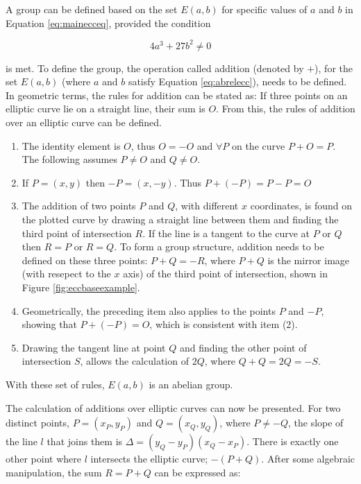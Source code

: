 \documentclass[a4paper,12pt]{report}
\begin{document}
A group can be defined based on the set $E(a,b)$ for specific values of $a$ and $b$ in Equation \ref{eq:mainecceq}, provided the condition

\begin{equation}
 4a^3 + 27b^2 \neq 0
\label{eq:abrelecc}
\end{equation}

is met. To define the group, the operation called addition (denoted by $+$), for the set $E(a,b)$ (where $a$ and $b$ satisfy Equation \ref{eq:abrelecc}), needs to be defined. In geometric terms, the rules for addition can be stated as: If three points on an elliptic curve lie on a straight line, their sum is $O$. From this, the rules of addition over an elliptic curve can be defined. 

\begin{enumerate}
 \item The identity element is $O$, thus $O = -O$ and $\forall P$ on the curve $P + O = P$. The following assumes $P \neq O$ and $Q \neq O$.
 \item If $P = (x,y)$ then $-P = (x,-y)$. Thus $P + (-P) = P - P = O$
 \item The addition of two points $P$ and $Q$, with different $x$ coordinates, is found on the plotted curve by drawing a straight line between them and finding the third point of intersection $R$. If the line is a tangent to the curve at $P$ or $Q$ then $R = P$ or $R = Q$. To form a group structure, addition needs to be defined on these three points: $P + Q = -R$, where $P + Q$ is the mirror image (with resepect to the $x$ axis) of the third point of intersection, shown in Figure \ref{fig:eccbaseexample}. 
 \item Geometrically, the preceding item also applies to the points $P$ and $-P$, showing that $P + (-P) = O$, which is consistent with item (2).
 \item Drawing the tangent line at point $Q$ and finding the other point of intersection $S$, allows the calculation of $2Q$, where $Q + Q = 2Q = -S$.
\end{enumerate}

With these set of rules, $E(a,b)$ is an abelian group. 

The calculation of additions over elliptic curves can now be presented. For two distinct points, $P = (x_{P},y_{P})$ and $Q = (x_{Q},y_{Q})$, where $P \neq -Q$, the slope of the line $l$ that joins them is $\Delta = (y_{Q} - y_{P})$\textfractionsolidus$(x_{Q} - x_{P})$. There is exactly one other point where $l$ intersects the elliptic curve; $-(P + Q)$. After some algebraic manipulation, the sum $R = P + Q$ can be expressed as:
\end{document}
